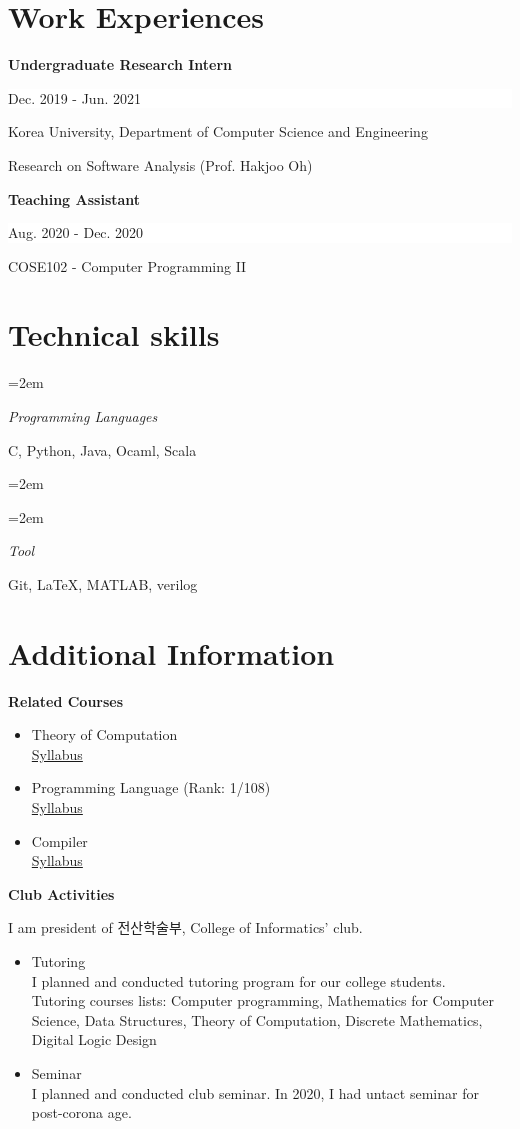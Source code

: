 \documentclass[paper=a4,fontsize=11pt]{scrartcl} %
\newlength{\spacebox}
\newcommand{\NewPart}[1]{\section*{{#1}}}
\newcommand{\PersonalEntry}[2]{
		\noindent\hangindent=2em\hangafter=0 %
		\parbox{\spacebox}{        %
		\textit{#1}}		       %
		\hspace{1.5em} #2 \par}    %
\newcommand{\SkillsEntry}[2]{      %
		\noindent\hangindent=2em\hangafter=0 %
		\parbox{\spacebox}{        %
		\textit{#1}}			   %
		\hspace{1.5em} #2 \par}    %
\newcommand{\EducationEntry}[4]{
		\noindent \textbf{#1} \hfill      %
		\colorbox{White}{%
			\parbox{5cm}{%
			\hfill\color{Black}#2}} \par  %
		\noindent #3 \par        %
		\noindent\small #4 %
		\normalsize \par}
\begin{document}
\newpage

\NewPart{Work Experiences}{}

\EducationEntry{Undergraduate Research Intern}{Dec. 2019 - Jun. 2021}{Korea University, Department of Computer Science and Engineering}{
	Research on Software Analysis (Prof. Hakjoo Oh) \\
}

\EducationEntry{Teaching Assistant}{Aug. 2020 - Dec. 2020}{COSE102 - Computer Programming II}{}


\NewPart{Technical skills}{}

\SkillsEntry{Programming Languages}{C, Python, Java, Ocaml, Scala}
\SkillsEntry{}{}
\SkillsEntry{Tool}{Git, \LaTeX, MATLAB, verilog}


\NewPart{Additional Information}{}

\EducationEntry{Related Courses}{}{
	\begin{itemize}
		\item Theory of Computation \\
		      \href{http://prl.korea.ac.kr/~pronto/home/courses/cose215/2019/slides/lec0.pdf}{Syllabus}
		\item Programming Language (Rank: 1/108) \\
		      \href{http://prl.korea.ac.kr/~pronto/home/courses/cose212/2019/syllabus.pdf}{Syllabus}
		\item Compiler \\
		      \href{http://prl.korea.ac.kr/~pronto/home/courses/cose312/2017/slides/lec0.pdf}{Syllabus}
	\end{itemize}
}{}

\EducationEntry{Club Activities}{}{
	I am president of 전산학술부, College of Informatics' club.
	\begin{itemize}
		\item Tutoring \\
		      I planned and conducted tutoring program for our college students. \\
		      Tutoring courses lists: Computer programming, Mathematics for Computer Science, Data Structures, Theory of Computation, Discrete Mathematics, Digital Logic Design
		\item Seminar \\
		      I planned and conducted club seminar. In 2020, I had untact seminar for post-corona age.
	\end{itemize}
}{}

\end{document}
